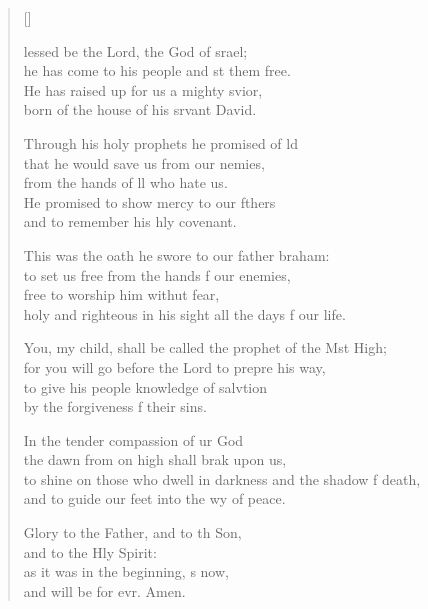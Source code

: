 \settowidth{\versewidth}{to shine on those who dwell in darkness and the shadow of death, *}
\begin{verse}[\versewidth]
  \begin{patverse}
lessed be the Lord, the God of srael;\Med\\
he has come to his people and st them free.\\
He has raised up for us a mighty svior,\Med\\
born of the house of his srvant David.

Through his holy prophets he promised of ld\Flex\\
that he would save us from our nemies,\Med\\
from the hands of ll who hate us.\\
He promised to show mercy to our fthers\Med\\
and to remember his hly covenant.

This was the oath he swore to our father braham:\Med\\
to set us free from the hands f our enemies,\\
free to worship him withut fear,\Med\\
holy and righteous in his sight all the days f our life. 

You, my child, shall be called the prophet of the Mst High;\Med\\
for you will go before the Lord to prepre his way,\\
to give his people knowledge of salvtion\Med\\
by the forgiveness f their sins.

In the tender compassion of ur God\Med\\
the dawn from on high shall brak upon us,\\
to shine on those who dwell in darkness and the shadow f death,\Med\\
and to guide our feet into the wy of peace.

Glory to the Father, and to th Son,\Med\\
and to the Hly Spirit:\\
as it was in the beginning, \pointup{\i}s now,\Med\\
and will be for evr. Amen.
  \end{patverse}
  \end{verse}
